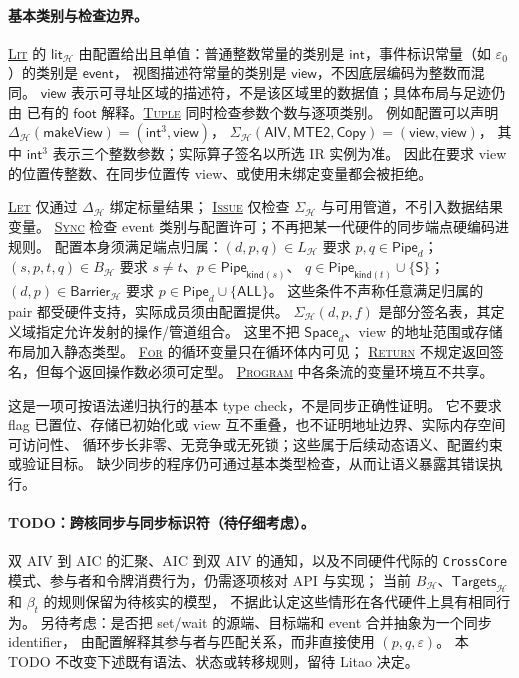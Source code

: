 \documentclass[UTF8,a4paper,11pt,fontset=fandol]{ctexart}
\begin{document}
\paragraph{基本类别与检查边界。}
\hyperlink{wf-lit}{\textsc{Lit}} 的 $\mathsf{lit}_{\mathcal H}$ 由配置给出且单值：普通整数常量的类别是
$\mathsf{int}$，事件标识常量（如 $\varepsilon_0$）的类别是 $\mathsf{event}$，
视图描述符常量的类别是 $\mathsf{view}$，不因底层编码为整数而混同。
$\mathsf{view}$ 表示可寻址区域的描述符，不是该区域里的数据值；具体布局与足迹仍由
已有的 $\mathsf{foot}$ 解释。\hyperlink{wf-tuple}{\textsc{Tuple}} 同时检查参数个数与逐项类别。
例如配置可以声明
$\Delta_{\mathcal H}(\mathsf{makeView})=(\mathsf{int}^3,\mathsf{view})$，
$\Sigma_{\mathcal H}(\mathsf{AIV},\mathsf{MTE2},\mathsf{Copy})=(\mathsf{view},\mathsf{view})$，
其中 $\mathsf{int}^3$ 表示三个整数参数；实际算子签名以所选 IR 实例为准。
因此在要求 view 的位置传整数、在同步位置传 view、或使用未绑定变量都会被拒绝。

\hyperlink{wf-let}{\textsc{Let}} 仅通过 $\Delta_{\mathcal H}$ 绑定标量结果；
\hyperlink{wf-issue}{\textsc{Issue}} 仅检查 $\Sigma_{\mathcal H}$ 与可用管道，不引入数据结果变量。
\hyperlink{wf-sync}{\textsc{Sync}} 检查 event 类别与配置许可；不再把某一代硬件的同步端点硬编码进规则。
配置本身须满足端点归属：$(d,p,q)\in L_{\mathcal H}$ 要求 $p,q\in\mathsf{Pipe}_d$；
$(s,p,t,q)\in B_{\mathcal H}$ 要求 $s\ne t$、$p\in\mathsf{Pipe}_{\mathsf{kind}(s)}$、
$q\in\mathsf{Pipe}_{\mathsf{kind}(t)}\cup\{\mathsf S\}$；
$(d,p)\in\mathsf{Barrier}_{\mathcal H}$ 要求 $p\in\mathsf{Pipe}_d\cup\{\mathsf{ALL}\}$。
这些条件不声称任意满足归属的 pair 都受硬件支持，实际成员须由配置提供。
$\Sigma_{\mathcal H}(d,p,f)$ 是部分签名表，其定义域指定允许发射的操作/管道组合。
这里不把 $\mathsf{Space}_d$、view 的地址范围或存储布局加入静态类型。
\hyperlink{wf-for}{\textsc{For}} 的循环变量只在循环体内可见；
\hyperlink{wf-return}{\textsc{Return}} 不规定返回签名，但每个返回操作数必须可定型。
\hyperlink{wf-program}{\textsc{Program}} 中各条流的变量环境互不共享。

这是一项可按语法递归执行的基本 type check，不是同步正确性证明。
它不要求 flag 已置位、存储已初始化或 view 互不重叠，也不证明地址边界、实际内存空间可访问性、
循环步长非零、无竞争或无死锁；这些属于后续动态语义、配置约束或验证目标。
缺少同步的程序仍可通过基本类型检查，从而让语义暴露其错误执行。

\paragraph{TODO：跨核同步与同步标识符（待仔细考虑）。}
双 AIV 到 AIC 的汇聚、AIC 到双 AIV 的通知，以及不同硬件代际的
\texttt{CrossCore} 模式、参与者和令牌消费行为，仍需逐项核对 API 与实现；
当前 $B_{\mathcal H}$、$\mathsf{Targets}_{\mathcal H}$ 和 $\beta_t$ 的规则保留为待核实的模型，
不据此认定这些情形在各代硬件上具有相同行为。
另待考虑：是否把 set/wait 的源端、目标端和 event 合并抽象为一个同步 identifier，
由配置解释其参与者与匹配关系，而非直接使用 $(p,q,\varepsilon)$。
本 TODO 不改变下述既有语法、状态或转移规则，留待 Litao 决定。
\end{document}
